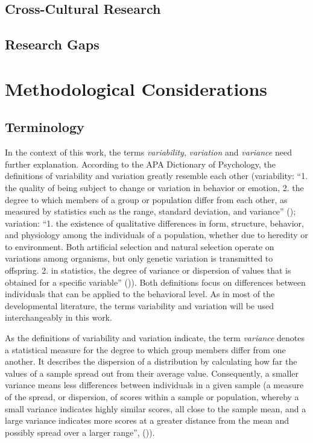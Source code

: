\documentclass[
]{scrbook}
\begin{document}
\subsection{Cross-Cultural Research}\label{cross-cultural-research-1}

\subsection{Research Gaps}\label{research-gaps}

\section{Methodological Considerations}\label{methodological-considerations}

\subsection{Terminology}\label{terminology-2}

In the context of this work, the terms \emph{variability}, \emph{variation} and \emph{variance} need further explanation. According to the APA Dictionary of Psychology, the definitions of variability and variation greatly resemble each other (variability: ``1. the quality of being subject to change or variation in behavior or emotion, 2. the degree to which members of a group or population differ from each other, as measured by statistics such as the range, standard deviation, and variance'' (); variation: ``1. the existence of qualitative differences in form, structure, behavior, and physiology among the individuals of a population, whether due to heredity or to environment. Both artificial selection and natural selection operate on variations among organisms, but only genetic variation is transmitted to offspring. 2. in statistics, the degree of variance or dispersion of values that is obtained for a specific variable'' ()). Both definitions focus on differences between individuals that can be applied to the behavioral level. As in most of the developmental literature, the terms variability and variation will be used interchangeably in this work.

As the definitions of variability and variation indicate, the term \emph{variance} denotes a statistical measure for the degree to which group members differ from one another. It describes the dispersion of a distribution by calculating how far the values of a sample spread out from their average value. Consequently, a smaller variance means less differences between individuals in a given sample (a measure of the spread, or dispersion, of scores within a sample or population, whereby a small variance indicates highly similar scores, all close to the sample mean, and a large variance indicates more scores at a greater distance from the mean and possibly spread over a larger range'', ()).
\end{document}
